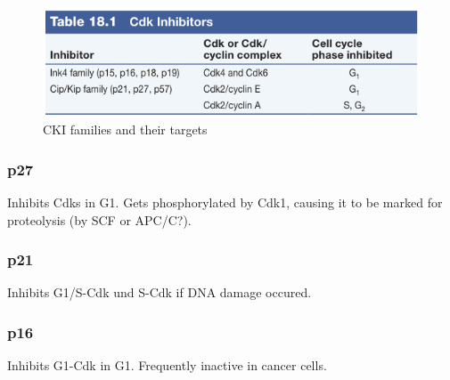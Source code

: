 \documentclass{article}
\begin{document}
	\begin{figure}[H]
		\centering
		\includegraphics[width=\linewidth]{ckis_cooper.png}
		\caption{CKI families and their targets}
	\end{figure}

	\subsubsection{p27}
	Inhibits Cdks in G1. Gets phosphorylated by Cdk1, causing it to be marked for proteolysis (by SCF or APC/C?). 
	
	\subsubsection{p21}
	Inhibits G1/S-Cdk und S-Cdk if DNA damage occured.
	
	\subsubsection{p16}
	Inhibits G1-Cdk in G1. Frequently inactive in cancer cells.
\end{document}
